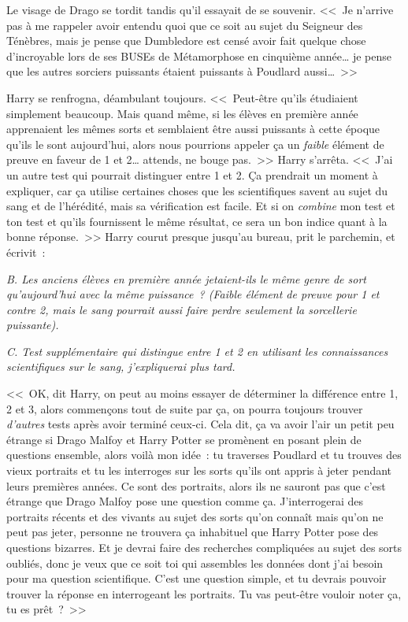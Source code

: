 Le visage de Drago se tordit tandis qu'il essayait de se souvenir. <<~Je n'arrive pas à me rappeler avoir entendu quoi que ce soit au sujet du Seigneur des Ténèbres, mais je pense que Dumbledore est censé avoir fait quelque chose d'incroyable lors de ses BUSEs de Métamorphose en cinquième année… je pense que les autres sorciers puissants étaient puissants à Poudlard aussi…~>>

Harry se renfrogna, déambulant toujours. <<~Peut-être qu'ils étudiaient simplement beaucoup. Mais quand même, si les élèves en première année apprenaient les mêmes sorts et semblaient être aussi puissants à cette époque qu'ils le sont aujourd'hui, alors nous pourrions appeler ça un \emph{faible} élément de preuve en faveur de 1 et 2… attends, ne bouge pas.~>> Harry s'arrêta. <<~J'ai un autre test qui pourrait distinguer entre 1 et 2. Ça prendrait un moment à expliquer, car ça utilise certaines choses que les scientifiques savent au sujet du sang et de l'hérédité, mais sa vérification est facile. Et si on \emph{combine} mon test et ton test et qu'ils fournissent le même résultat, ce sera un bon indice quant à la bonne réponse.~>> Harry courut presque jusqu'au bureau, prit le parchemin, et écrivit~:

\emph{B. Les anciens élèves en première année jetaient-ils le même genre de sort qu'aujourd'hui avec la même puissance~? (Faible élément de preuve pour 1 et contre 2, mais le sang pourrait aussi faire perdre seulement la sorcellerie puissante).}

\emph{C. Test supplémentaire qui distingue entre 1 et 2 en utilisant les connaissances scientifiques sur le sang, j'expliquerai plus tard.}

<<~OK, dit Harry, on peut au moins essayer de déterminer la différence entre 1, 2 et 3, alors commençons tout de suite par ça, on pourra toujours trouver \emph{d'autres} tests après avoir terminé ceux-ci. Cela dit, ça va avoir l'air un petit peu étrange si Drago Malfoy et Harry Potter se promènent en posant plein de questions ensemble, alors voilà mon idée~: tu traverses Poudlard et tu trouves des vieux portraits et tu les interroges sur les sorts qu'ils ont appris à jeter pendant leurs premières années. Ce sont des portraits, alors ils ne sauront pas que c'est étrange que Drago Malfoy pose une question comme ça. J'interrogerai des portraits récents et des vivants au sujet des sorts qu'on connaît mais qu'on ne peut pas jeter, personne ne trouvera ça inhabituel que Harry Potter pose des questions bizarres. Et je devrai faire des recherches compliquées au sujet des sorts oubliés, donc je veux que ce soit toi qui assembles les données dont j'ai besoin pour ma question scientifique. C'est une question simple, et tu devrais pouvoir trouver la réponse en interrogeant les portraits. Tu vas peut-être vouloir noter ça, tu es prêt~?~>>

